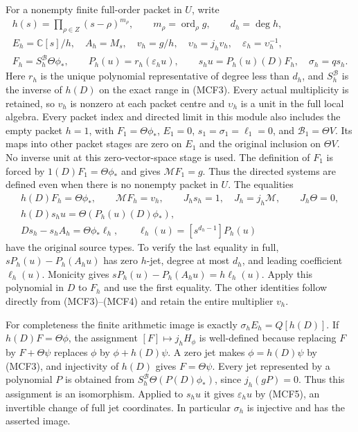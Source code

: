 For a nonempty finite full-order packet in $U$, write
\[
\begin{gathered}
h(s)=\prod_{\rho\in Z}(s-\rho)^{m_\rho},\qquad
m_\rho=\operatorname{ord}_\rho g,\qquad d_h=\deg h,\\
E_h=\mathbb C[s]/h,\quad A_h=M_s,\quad v_h=g/h,\quad
\upsilon_h=j_hv_h,\quad\varepsilon_h=\upsilon_h^{-1},\\
F_h=S_h^{\mathscr B}\Theta\phi_*,\qquad
P_h(u)=r_h(\varepsilon_hu),\qquad
s_hu=P_h(u)(D)F_h,\quad \sigma_h=qs_h.
\end{gathered}
\tag{MCF4}
\]
Here $r_h$ is the unique polynomial representative of degree less than
$d_h$, and $S_h^{\mathscr B}$ is the inverse of $h(D)$ on the exact range
in (MCF3).  Every actual multiplicity is retained, so $v_h$ is nonzero
at each packet centre and $\upsilon_h$ is a unit in the full local algebra.
Every packet index and directed limit in this module also includes the
empty packet $h=1$, with
$F_1=\Theta\phi_*$, $E_1=0$, $s_1=\sigma_1=\ell_1=0$, and
$\mathscr B_1=\Theta V$.  Its maps into other packet stages are zero
on $E_1$ and the original inclusion on $\Theta V$.  No inverse unit
at this zero-vector-space stage is used.  The definition of $F_1$ is
forced by $1(D)F_1=\Theta\phi_*$ and gives $\mathcal MF_1=g$.
Thus the directed systems
are defined even when there is no nonempty packet in $U$.
The equalities
\[
\begin{gathered}
h(D)F_h=\Theta\phi_*,\qquad \mathcal MF_h=v_h,\qquad
J_hs_h=1,\quad J_h=j_h\mathcal M,\qquad J_h\Theta=0,\\
h(D)s_hu=\Theta(P_h(u)(D)\phi_*),\\
Ds_h-s_hA_h=\Theta\phi_*\ell_h,\qquad
\ell_h(u)=[s^{d_h-1}]P_h(u)
\end{gathered}
\tag{MCF5}
\]
have the original source types.  To verify the last equality in full,
$sP_h(u)-P_h(A_hu)$ has zero $h$-jet, degree at most $d_h$, and leading
coefficient $\ell_h(u)$.  Monicity gives
$sP_h(u)-P_h(A_hu)=h\ell_h(u)$.  Apply this polynomial in $D$ to $F_h$
and use the first equality.  The other identities follow directly from
(MCF3)--(MCF4) and retain the entire multiplier $v_h$.

For completeness the finite arithmetic image is exactly
$\sigma_hE_h=Q[h(D)]$.  If $h(D)F=\Theta\phi$, the assignment
$[F]\mapsto j_hH_\phi$ is well-defined because replacing $F$ by
$F+\Theta\psi$ replaces $\phi$ by $\phi+h(D)\psi$.  A zero jet makes
$\phi=h(D)\psi$ by (MCF3), and injectivity of $h(D)$ gives
$F=\Theta\psi$.  Every jet represented by a polynomial $P$ is obtained
from $S_h^{\mathscr B}\Theta(P(D)\phi_*)$, since $j_h(gP)=0$.
Thus this assignment is an isomorphism.  Applied to $s_hu$ it gives
$\varepsilon_hu$ by (MCF5), an invertible change of full jet coordinates.
In particular $\sigma_h$ is injective and has the asserted image.

